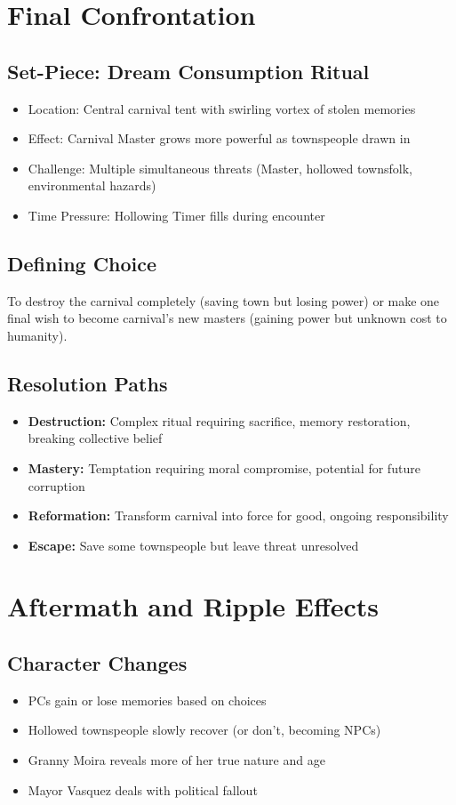 \documentclass[11pt]{article}
\begin{document}
\section{Final Confrontation}

\subsection{Set-Piece: Dream Consumption Ritual}
\begin{itemize}
\item Location: Central carnival tent with swirling vortex of stolen memories
\item Effect: Carnival Master grows more powerful as townspeople drawn in
\item Challenge: Multiple simultaneous threats (Master, hollowed townsfolk, environmental hazards)
\item Time Pressure: Hollowing Timer fills during encounter
\end{itemize}

\subsection{Defining Choice}
To destroy the carnival completely (saving town but losing power) or make one final wish to become carnival's new masters (gaining power but unknown cost to humanity).

\subsection{Resolution Paths}
\begin{itemize}
\item \textbf{Destruction:} Complex ritual requiring sacrifice, memory restoration, breaking collective belief
\item \textbf{Mastery:} Temptation requiring moral compromise, potential for future corruption
\item \textbf{Reformation:} Transform carnival into force for good, ongoing responsibility
\item \textbf{Escape:} Save some townspeople but leave threat unresolved
\end{itemize}

\section{Aftermath and Ripple Effects}

\subsection{Character Changes}
\begin{itemize}
\item PCs gain or lose memories based on choices
\item Hollowed townspeople slowly recover (or don't, becoming NPCs)
\item Granny Moira reveals more of her true nature and age
\item Mayor Vasquez deals with political fallout
\end{itemize}
\end{document}
